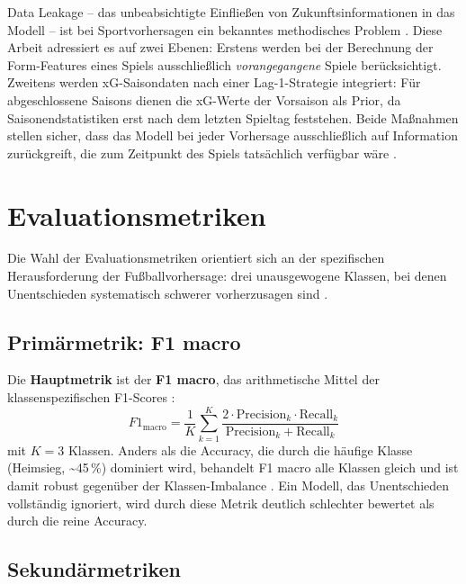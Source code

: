 Data Leakage -- das unbeabsichtigte Einfließen von Zukunftsinformationen
in das Modell -- ist bei Sportvorhersagen ein bekanntes methodisches
Problem \cite{KaufmanRossetPerlich2012}. Diese Arbeit adressiert es auf
zwei Ebenen: Erstens werden bei der Berechnung der Form-Features eines
Spiels ausschließlich \emph{vorangegangene} Spiele berücksichtigt.
Zweitens werden xG-Saisondaten nach einer Lag-1-Strategie integriert:
Für abgeschlossene Saisons dienen die xG-Werte der Vorsaison als Prior,
da Saisonendstatistiken erst nach dem letzten Spieltag feststehen.
Beide Maßnahmen stellen sicher, dass das Modell bei jeder Vorhersage
ausschließlich auf Information zurückgreift, die zum Zeitpunkt des Spiels
tatsächlich verfügbar wäre \cite{KaufmanRossetPerlich2012}.

\section{Evaluationsmetriken}
\label{sec:metriken}

Die Wahl der Evaluationsmetriken orientiert sich an der spezifischen
Herausforderung der Fußballvorhersage: drei unausgewogene Klassen, bei
denen Unentschieden systematisch schwerer vorherzusagen sind
\cite{HeGarcia2009}.

\subsection{Primärmetrik: F1 macro}

Die \textbf{Hauptmetrik} ist der \textbf{F1 macro}, das arithmetische
Mittel der klassenspezifischen F1-Scores \cite{Powers2020}:
\begin{equation}
    F1_{\text{macro}} = \frac{1}{K} \sum_{k=1}^{K}
    \frac{2 \cdot \text{Precision}_k \cdot \text{Recall}_k}
         {\text{Precision}_k + \text{Recall}_k}
\end{equation}
mit $K = 3$ Klassen. Anders als die Accuracy, die durch die häufige
Klasse (Heimsieg, \textasciitilde 45\,\%) dominiert wird, behandelt
F1 macro alle Klassen gleich und ist damit robust gegenüber der
Klassen-Imbalance \cite{Powers2020,HeGarcia2009}. Ein Modell, das
Unentschieden vollständig ignoriert, wird durch diese Metrik deutlich
schlechter bewertet als durch die reine Accuracy.

\subsection{Sekundärmetriken}

